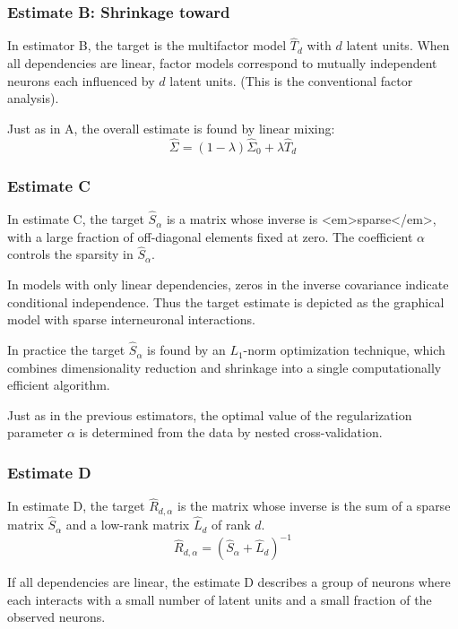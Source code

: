 \subsubsection*{Estimate B: Shrinkage toward }
In estimator B, the target is the multifactor model $ \hat T_d$ with $ d$ latent units. When all dependencies are linear, factor models correspond to mutually independent neurons each influenced by $ d$ latent units. (This is  the conventional factor analysis).

Just as in A, the overall estimate is found by linear mixing:
\begin{equation}
\hat\Sigma = (1-\lambda)\hat\Sigma_0 + \lambda\hat T_d
\end{equation}

\subsubsection*{Estimate C}
In estimate C, the target $ \hat S_\alpha$ is a matrix whose inverse is <em>sparse</em>, with a large fraction of off-diagonal elements fixed at zero. The coefficient $ \alpha$ controls the sparsity in $ \hat S_\alpha$.

In models with only linear dependencies, zeros in the inverse covariance indicate conditional independence. Thus the target estimate is depicted as the graphical model with sparse interneuronal interactions.

In practice the target $\hat S_\alpha$ is found by an $ L_1$-norm optimization technique, which combines dimensionality reduction and shrinkage into a single computationally efficient algorithm.

Just as in the previous estimators, the optimal value of the regularization parameter $ \alpha$ is determined from the data by nested cross-validation.

\subsubsection*{Estimate D}
In estimate D, the target $\hat R_{d,\alpha}$ is the matrix whose inverse is the sum of a sparse matrix $\hat S_\alpha$ and a low-rank matrix $\hat L_d$ of rank $d$.
\begin{equation}
\hat R_{d,\alpha} = (\hat S_\alpha + \hat L_d)^{-1}
\end{equation}

If all dependencies are linear, the estimate D describes a group of neurons where each interacts with a small number of latent units and a small fraction of the observed neurons. 

